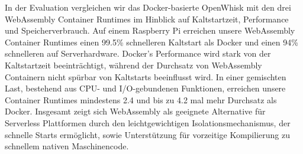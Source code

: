 \documentclass[draft, final, x11names, svgnames]{template/vutinfth} %
\begin{document}
\begin{kurzfassung}
In der Evaluation vergleichen wir das Docker-basierte OpenWhisk mit den drei WebAssembly Container Runtimes im Hinblick auf Kaltstartzeit, Performance und Speicherverbrauch. Auf einem Raspberry Pi erreichen unsere WebAssembly Container Runtimes einen 99.5\% schnelleren Kaltstart als Docker und einen 94\% schnelleren auf Serverhardware. Docker's Performance wird stark von der Kaltstartzeit beeinträchtigt, während der Durchsatz von WebAssembly Containern nicht spürbar von Kaltstarts beeinflusst wird. In einer gemischten Last, bestehend aus CPU- und I/O-gebundenen Funktionen, erreichen unsere Container Runtimes mindestens 2.4 und bis zu 4.2 mal mehr Durchsatz als Docker. Insgesamt zeigt sich WebAssembly als geeignete Alternative für Serverless Plattformen durch den leichtgewichtigen Isolationsmechanismus, der schnelle Starts ermöglicht, sowie Unterstützung für vorzeitige Kompilierung zu schnellem nativen Maschinencode.

\end{kurzfassung}
\end{document}
